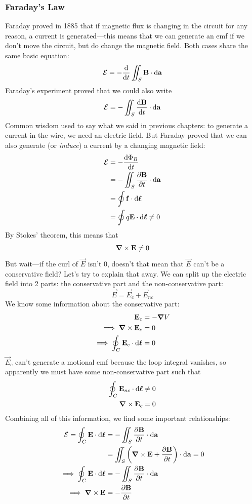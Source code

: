\documentclass[a4paper]{article}
\begin{document}
\subsubsection{Faraday's Law}
Faraday proved in 1885 that if magnetic flux is changing in the circuit for
any reason, a current is generated---this means
that we can generate an emf if we don't move the circuit,
but do change the magnetic field. Both cases share the same basic equation:
\[ \mathcal{E} = -\frac{\mathrm{d} }{\mathrm{d} t}\iint_S\boldsymbol{\mathbf{B}}\cdot\mathrm{d}\boldsymbol{\mathbf{a}} \]
Faraday's experiment proved that we could also write
\[ \mathcal{E} = -\iint_S \frac{\mathrm{d} \boldsymbol{\mathbf{B}}}{\mathrm{d} t}\cdot\mathrm{d}\boldsymbol{\mathbf{a}} \]
Common wisdom used to say what we said in previous chapters: to generate a
current in the wire, we need an electric field. But Faraday proved that we can
also generate (or \emph{induce}) a current by a changing magnetic field:
\begin{align*}
	\mathcal{E} &= -\frac{\mathrm{d} \Phi_B}{\mathrm{d} t}\\
	   &= -\iint_S \frac{\partial \boldsymbol{\mathbf{B}}}{\partial t}\cdot\mathrm{d}\boldsymbol{\mathbf{a}}\\
	   &= \oint \boldsymbol{\mathbf{f}} \cdot \mathrm{d}\boldsymbol{\mathbf{\ell}}\\
	   &= \oint q\boldsymbol{\mathbf{E}} \cdot \mathrm{d}\boldsymbol{\mathbf{\ell}} \neq 0
\end{align*}
By Stokes' theorem, this means that
\[ \boldsymbol{\mathbf{\nabla}}\times\boldsymbol{\mathbf{E}} \neq 0 \]
But wait---if the curl of $\vec{E}$ isn't 0, doesn't that mean that $\vec{E}$
can't be a conservative field? Let's try to explain that away. We can split up
the electric field into 2 parts: the conservative part and the non-conservative
part:
\[ \vec{E} = \vec{E}_c + \vec{E}_{nc} \]
We know some information about the conservative part:
\begin{align*}
	\boldsymbol{\mathbf{E}}_c &= -\boldsymbol{\mathbf{\nabla}} V\\
	\implies \boldsymbol{\mathbf{\nabla}} \times \boldsymbol{\mathbf{E}}_c &= 0\\
	\implies \oint_C \boldsymbol{\mathbf{E}}_c \cdot \mathrm{d}\boldsymbol{\mathbf{\ell}} &= 0
\end{align*}
$\vec{E}_c$ can't generate a motional emf because the loop integral vanishes,
so apparently we must have some non-conservative part such that
\begin{align*}
	\oint_C \boldsymbol{\mathbf{E}}_{nc} \cdot \mathrm{d}\boldsymbol{\mathbf{\ell}} &\neq 0\\
	\boldsymbol{\mathbf{\nabla}} \times \boldsymbol{\mathbf{E}}_c &= 0
\end{align*}
Combining all of this information, we find some important relationships:
\begin{align*}
	\mathcal{E} = \oint_C \boldsymbol{\mathbf{E}}\cdot\mathrm{d}\boldsymbol{\mathbf{\ell}}
		&= -\iint_S\frac{\partial \boldsymbol{\mathbf{B}}}{\partial t} \cdot \mathrm{d}\boldsymbol{\mathbf{a}}\\
		&= \iint_S \left(\boldsymbol{\mathbf{\nabla}}\times\boldsymbol{\mathbf{E}} + \frac{\partial \boldsymbol{\mathbf{B}}}{\partial t}\right)
			\cdot \mathrm{d}\boldsymbol{\mathbf{a}} = 0\\
	\implies \oint_C\boldsymbol{\mathbf{E}}\cdot\mathrm{d}\boldsymbol{\mathbf{\ell}} &= -\iint_S\frac{\partial \boldsymbol{\mathbf{B}}}{\partial t}
		\cdot\mathrm{d}\boldsymbol{\mathbf{a}}\\
	\implies \boldsymbol{\mathbf{\nabla}}\times\boldsymbol{\mathbf{E}} &= -\frac{\partial \boldsymbol{\mathbf{B}}}{\partial t}\\
\end{align*}
\end{document}
